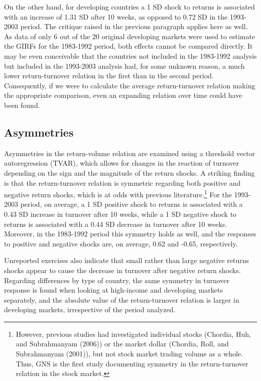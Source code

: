 \documentclass[final,3p,times,twocolumn]{elsarticle}
\begin{document}
On the other hand, for developing countries a 1 SD shock to returns is associated with an increase of 1.31 SD after 10 weeks, as opposed to 0.72 SD in the 1993-2003 period. The critique raised in the previous paragraph applies here as well. As data of only 6 out of the 20 original developing markets were used to estimate the GIRFs for the 1983-1992 period, both effects cannot be compared directly. It may be even conceivable that the countries not included in the 1983-1992 analysis but included in the 1993-2003 analysis had, for some unknown reason, a much lower return-turnover relation in the first than in the second period. Consequently, if we were to calculate the average return-turnover relation making the appropriate comparison, even an expanding relation over time could have been found.\par


\subsection{Asymmetries}

Asymmetries in the return-volume relation are examined using a threshold vector autoregression (TVAR), which allows for changes in the reaction of turnover depending on the sign and the magnitude of the return shocks. A striking finding is that the return-turnover relation is symmetric regarding both positive and negative return shocks, which is at odds with previous literature.\footnote{However, previous studies had investigated individual stocks (Chordia, Huh, and Subrahmanyam (2006)) or the market dollar (Chordia, Roll, and Subrahmanyam (2001)), but not stock market trading volume as a whole. Thus, GNS is the first study documenting symmetry in the return-turnover relation in the stock market.} For the 1993-2003 period, on average, a 1 SD positive shock to returns is associated with a 0.43 SD increase in turnover after 10 weeks, while a 1 SD negative shock to returns is associated with a 0.44 SD decrease in turnover after 10 weeks. Moreover, in the 1983-1992 period this symmetry holds as well, and the responses to positive and negative shocks are, on average, 0.62 and -0.65, respectively.\par

Unreported exercises also indicate that small rather than large negative returns shocks appear to cause the decrease in turnover after negative return shocks. Regarding differences by type of country, the same symmetry in turnover response is found when looking at high-income and developing markets separately, and the absolute value of the return-turnover relation is larger in developing markets, irrespective of the period analyzed. \par
\end{document}
